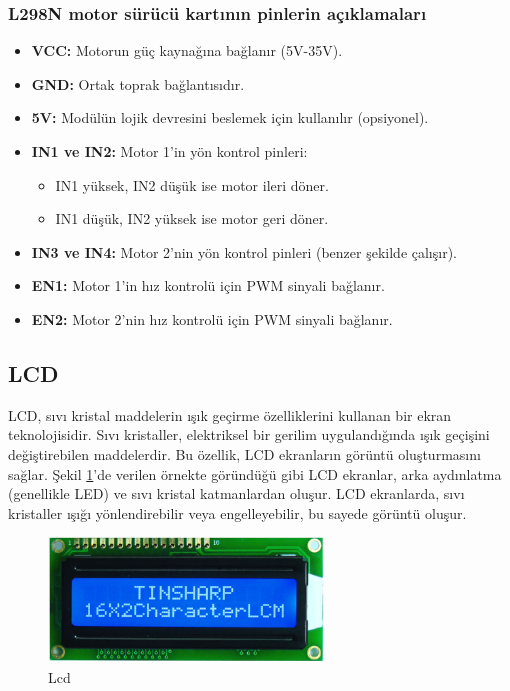 \subsubsection{L298N motor sürücü kartının pinlerin açıklamaları}
\begin{itemize}
\item \textbf{ VCC:} Motorun güç kaynağına bağlanır (5V-35V).
\item \textbf{GND:}  Ortak toprak bağlantısıdır.
\item \textbf{5V:} Modülün lojik devresini beslemek için kullanılır (opsiyonel).
\item \textbf{IN1 ve IN2:} Motor 1'in yön kontrol pinleri:
\begin{itemize}
\item IN1 yüksek, IN2 düşük ise motor ileri döner.
\item IN1 düşük, IN2 yüksek ise motor geri döner.
\end{itemize}
\item \textbf{IN3 ve IN4:} Motor 2'nin yön kontrol pinleri (benzer şekilde çalışır).
\item \textbf{EN1:} Motor 1'in hız kontrolü için PWM sinyali bağlanır.
\item \textbf{EN2:} Motor 2'nin hız kontrolü için PWM sinyali bağlanır.

\end{itemize}
\subsection{LCD}
    LCD, sıvı kristal maddelerin ışık geçirme özelliklerini kullanan bir ekran teknolojisidir. Sıvı kristaller, elektriksel bir gerilim uygulandığında ışık geçişini değiştirebilen maddelerdir. Bu özellik, LCD ekranların görüntü oluşturmasını sağlar. Şekil \ref{fig:14}'de verilen örnekte göründüğü gibi LCD ekranlar, arka aydınlatma (genellikle LED) ve sıvı kristal katmanlardan oluşur. LCD ekranlarda, sıvı kristaller ışığı yönlendirebilir veya engelleyebilir, bu sayede görüntü oluşur.

\begin{figure}[H]
\centering
\includegraphics[width=0.65\textwidth]{Resimler/14.png}
\caption{Lcd}
\label{fig:14}
\end{figure}

